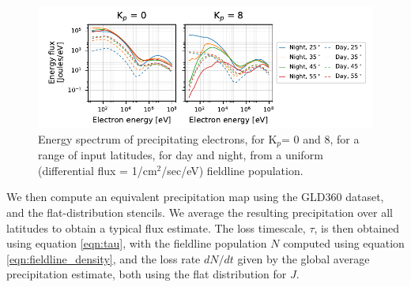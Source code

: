 \begin{figure}[]
\begin{center}
\includegraphics{figures/stencil_energy_spectrum_flat_distribution.pdf}
\caption[Energy spectrum of LEP stencils, drawn from a uniform radiation belt population]{Energy spectrum of precipitating electrons, for K$_p$= 0 and 8, for a range of input latitudes, for day and night, from a uniform (differential flux = 1/cm$^2$/sec/eV) fieldline population.}
\label{fig:stencil_energy_spectrum_flat_distribution}
\end{center}
\end{figure}

We then compute an equivalent precipitation map using the GLD360 dataset, and the flat-distribution stencils. We average the resulting precipitation over all latitudes to obtain a typical flux estimate. The loss timescale, $\tau$, is then obtained using equation \eqref{eqn:tau}, with the fieldline population $N$ computed using equation \eqref{eqn:fieldline_density}, and the loss rate $dN/dt$ given by the global average precipitation estimate, both using the flat distribution for $J$.

